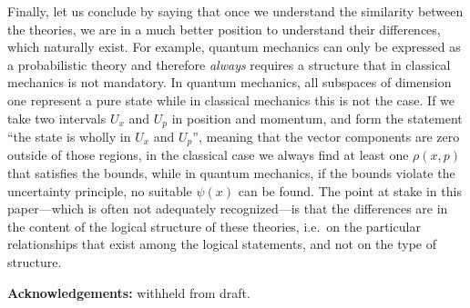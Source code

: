 \documentclass[11pt, executivepaper]{article}
\begin{document}
Finally, let us conclude by saying that once we understand the similarity between the theories, we are in a much better position to understand their differences, which naturally exist. For example, quantum mechanics can only be expressed as a probabilistic theory and therefore \emph{always} requires a structure that in classical mechanics is not mandatory. In quantum mechanics, all subspaces of dimension one represent a pure state while in classical mechanics this is not the case. If we take two intervals $U_x$ and $U_p$ in position and momentum, and form the statement ``the state is wholly in $U_x$ and $U_p$'', meaning that the vector components are zero outside of those regions, in the classical case we always find at least one $\rho(x,p)$ that satisfies the bounds, while in quantum mechanics, if the bounds violate the uncertainty principle, no suitable $\psi(x)$ can be found. The point at stake in this paper---which is often not adequately recognized---is that the differences  are in the content of the logical structure of these theories, i.e.\ on the particular relationships that exist among the logical statements, and not on the type of structure.
\vspace{5mm}

\textbf{Acknowledgements:} withheld from draft.
\clearpage



\end{document}
